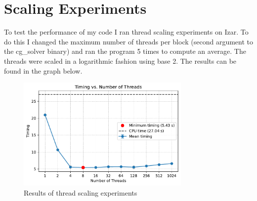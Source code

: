 
\section{Scaling Experiments}
To test the performance of my code I ran thread scaling experiments on Izar. To do this I changed the maximum number of
threads per block (second argument to the cg\_solver binary) and ran the program 5 times to compute an average.
The threads were scaled in a logarithmic fashion using base 2. The results can be found in the graph below.

\begin{figure}[h!]
    \centering
    \includegraphics[width=0.75\textwidth]{plots/timing_vs_threads.pdf}
    \caption{Results of thread scaling experiments}
\end{figure}

